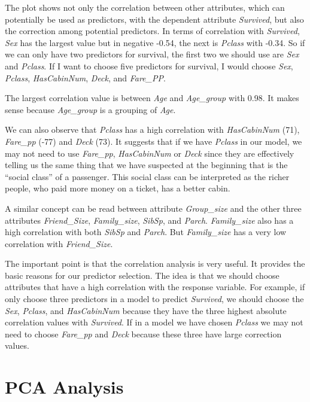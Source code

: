 \documentclass[
]{book}
\begin{document}
The plot shows not only the correlation between other attributes, which can potentially be used as predictors, with the dependent attribute \emph{Survived}, but also the correction among potential predictors. In terms of correlation with \emph{Survived}, \emph{Sex} has the largest value but in negative -0.54, the next is \emph{Pclass} with -0.34. So if we can only have two predictors for survival, the first two we should use are \emph{Sex} and \emph{Pclass}. If I want to choose five predictors for survival, I would choose \emph{Sex}, \emph{Pclass}, \emph{HasCabinNum}, \emph{Deck}, and \emph{Fare\_PP}.

The largest correlation value is between \emph{Age} and \emph{Age\_group} with 0.98. It makes sense because \emph{Age\_group} is a grouping of \emph{Age}.

We can also observe that \emph{Pclass} has a high correlation with \emph{HasCabinNum} (71), \emph{Fare\_pp} (-77) and \emph{Deck} (73). It suggests that if we have \emph{Pclass} in our model, we may not need to use \emph{Fare\_pp}, \emph{HasCabinNum} or \emph{Deck} since they are effectively telling us the same thing that we have suspected at the beginning that is the ``social class'' of a passenger. This social class can be interpreted as the richer people, who paid more money on a ticket, has a better cabin.

A similar concept can be read between attribute \emph{Group\_size} and the other three attributes \emph{Friend\_Size}, \emph{Family\_size}, \emph{SibSp}, and \emph{Parch}. \emph{Family\_size} also has a high correlation with both \emph{SibSp} and \emph{Parch}. But \emph{Family\_size} has a very low correlation with \emph{Friend\_Size}.

The important point is that the correlation analysis is very useful. It provides the basic reasons for our predictor selection. The idea is that we should choose attributes that have a high correlation with the response variable. For example, if only choose three predictors in a model to predict \emph{Survived}, we should choose the \emph{Sex}, \emph{Pclass}, and \emph{HasCabinNum} because they have the three highest absolute correlation values with \emph{Survived}. If in a model we have chosen \emph{Pclass} we may not need to choose \emph{Fare\_pp} and \emph{Deck} because these three have large correction values.

\hypertarget{pca-analysis}{%
\section{PCA Analysis}\label{pca-analysis}}
\end{document}
